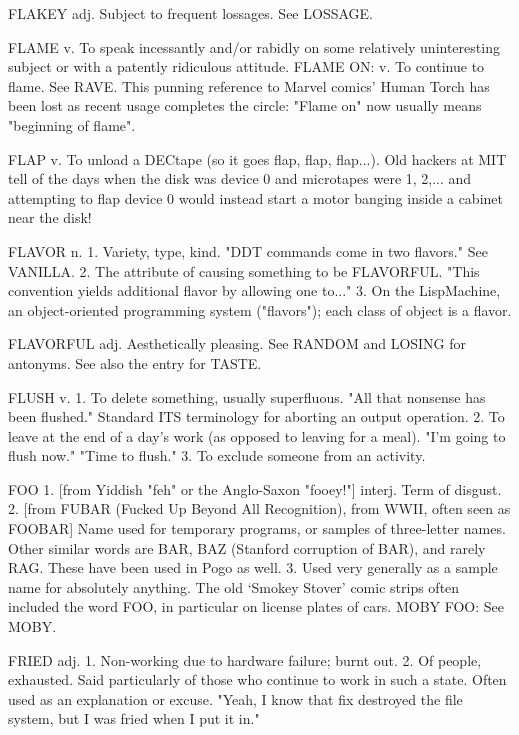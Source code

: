 FLAKEY adj. Subject to frequent lossages.  See LOSSAGE.

FLAME v. To speak incessantly and/or rabidly on some relatively
   uninteresting subject or with a patently ridiculous attitude.
   FLAME ON: v. To continue to flame.  See RAVE.  This punning
   reference to Marvel comics' Human Torch has been lost as
   recent usage completes the circle:  "Flame on" now usually
   means "beginning of flame".

FLAP v. To unload a DECtape (so it goes flap, flap, flap...).  Old
   hackers at MIT tell of the days when the disk was device 0 and
   microtapes were 1, 2,... and attempting to flap device 0 would
   instead start a motor banging inside a cabinet near the disk!

FLAVOR n. 1. Variety, type, kind.  "DDT commands come in two flavors."
   See VANILLA.	 2. The attribute of causing something to be
   FLAVORFUL.  "This convention yields additional flavor by allowing
   one to..."  3. On the LispMachine, an object-oriented programming
   system ("flavors"); each class of object is a flavor.

FLAVORFUL adj. Aesthetically pleasing.	See RANDOM and LOSING for
   antonyms.  See also the entry for TASTE.

FLUSH v. 1. To delete something, usually superfluous.  "All that
   nonsense has been flushed."	Standard ITS terminology for aborting
   an output operation.	 2. To leave at the end of a day's work (as
   opposed to leaving for a meal).  "I'm going to flush now."  "Time
   to flush."  3. To exclude someone from an activity.

FOO 1. [from Yiddish "feh" or the Anglo-Saxon "fooey!"] interj. Term
   of disgust.	2. [from FUBAR (Fucked Up Beyond All Recognition),
   from WWII, often seen as FOOBAR] Name used for temporary programs,
   or samples of three-letter names.  Other similar words are BAR, BAZ
   (Stanford corruption of BAR), and rarely RAG.  These have been used
   in Pogo as well.  3. Used very generally as a sample name for
   absolutely anything.	 The old `Smokey Stover' comic strips often
   included the word FOO, in particular on license plates of cars.
   MOBY FOO: See MOBY.

FRIED adj. 1. Non-working due to hardware failure; burnt out.  2. Of
   people, exhausted.  Said particularly of those who continue to work
   in such a state.  Often used as an explanation or excuse.  "Yeah, I
   know that fix destroyed the file system, but I was fried when I put
   it in."

